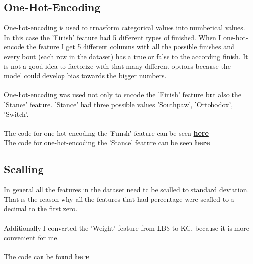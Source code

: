 \documentclass{article}
\begin{document}
  \subsection{One-Hot-Encoding} %
  One-hot-encoding is used to trnasform categorical values into numberical values. In this case the 'Finish' feature had 5 different types of finished. When I one-hot-encode 
  the feature I get 5 different columns with all the possible finishes and every bout (each row in the dataset) has a true or false to the according finish. It is not a good idea 
  to factorize with that many different options because the model could develop bias towards the bigger numbers.\\\\ 
  One-hot-encoding was used not only to encode the 'Finish' feature but also the 'Stance' feature. 'Stance' had three possible values 'Southpaw', 'Ortohodox', 'Switch'.\\\\
  The code for one-hot-encoding the 'Finish' feature can be seen \href{fig:One_hot_encoding_finish}{\textbf{here}}\\ 
  The code for one-hot-encoding the 'Stance' feature can be seen \href{fig:One_hot_encoding_stance}{\textbf{here}}
  \subsection{Scalling}
  In general all the features in the dataset need to be scalled to standard deviation. That is the reason why all the features that had percentage were scalled to a decimal to the first zero.\\\\ 
  Additionally I converted the 'Weight' feature from LBS to KG, because it is more convenient for me. \\\\
  The code can be found \href{fig:converting_weight}{\textbf{here}}
\end{document}
